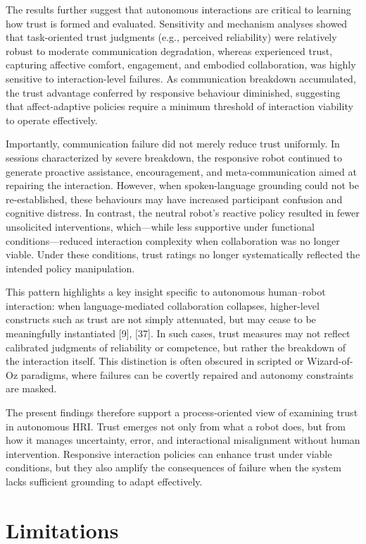\documentclass[
  letterpaper,
  DIV=11,
  numbers=noendperiod]{scrartcl}
\begin{document}
The results further suggest that autonomous interactions are critical to
learning how trust is formed and evaluated. Sensitivity and mechanism
analyses showed that task-oriented trust judgments (e.g., perceived
reliability) were relatively robust to moderate communication
degradation, whereas experienced trust, capturing affective comfort,
engagement, and embodied collaboration, was highly sensitive to
interaction-level failures. As communication breakdown accumulated, the
trust advantage conferred by responsive behaviour diminished, suggesting
that affect-adaptive policies require a minimum threshold of interaction
viability to operate effectively.

Importantly, communication failure did not merely reduce trust
uniformly. In sessions characterized by severe breakdown, the responsive
robot continued to generate proactive assistance, encouragement, and
meta-communication aimed at repairing the interaction. However, when
spoken-language grounding could not be re-established, these behaviours
may have increased participant confusion and cognitive distress. In
contrast, the neutral robot's reactive policy resulted in fewer
unsolicited interventions, which---while less supportive under
functional conditions---reduced interaction complexity when
collaboration was no longer viable. Under these conditions, trust
ratings no longer systematically reflected the intended policy
manipulation.

This pattern highlights a key insight specific to autonomous
human--robot interaction: when language-mediated collaboration
collapses, higher-level constructs such as trust are not simply
attenuated, but may cease to be meaningfully instantiated {[}9{]},
{[}37{]}. In such cases, trust measures may not reflect calibrated
judgments of reliability or competence, but rather the breakdown of the
interaction itself. This distinction is often obscured in scripted or
Wizard-of-Oz paradigms, where failures can be covertly repaired and
autonomy constraints are masked.

The present findings therefore support a process-oriented view of
examining trust in autonomous HRI. Trust emerges not only from what a
robot does, but from how it manages uncertainty, error, and
interactional misalignment without human intervention. Responsive
interaction policies can enhance trust under viable conditions, but they
also amplify the consequences of failure when the system lacks
sufficient grounding to adapt effectively.

\section{Limitations}\label{limitations}
\end{document}
